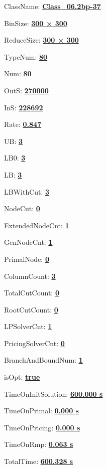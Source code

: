 \documentclass[11pt]{article}
\begin{document}
\pagestyle{empty}


ClassName: \underline{\textbf{Class_06.2bp-37}}
\par
BinSize: \underline{\textbf{300 × 300}}
\par
ReduceSize: \underline{\textbf{300 × 300}}
\par
TypeNum: \underline{\textbf{80}}
\par
Num: \underline{\textbf{80}}
\par
OutS: \underline{\textbf{270000}}
\par
InS: \underline{\textbf{228692}}
\par
Rate: \underline{\textbf{0.847}}
\par
UB: \underline{\textbf{3}}
\par
LB0: \underline{\textbf{3}}
\par
LB: \underline{\textbf{3}}
\par
LBWithCut: \underline{\textbf{3}}
\par
NodeCut: \underline{\textbf{0}}
\par
ExtendedNodeCnt: \underline{\textbf{1}}
\par
GenNodeCnt: \underline{\textbf{1}}
\par
PrimalNode: \underline{\textbf{0}}
\par
ColumnCount: \underline{\textbf{3}}
\par
TotalCutCount: \underline{\textbf{0}}
\par
RootCutCount: \underline{\textbf{0}}
\par
LPSolverCnt: \underline{\textbf{1}}
\par
PricingSolverCnt: \underline{\textbf{0}}
\par
BranchAndBoundNum: \underline{\textbf{1}}
\par
isOpt: \underline{\textbf{true}}
\par
TimeOnInitSolution: \underline{\textbf{600.000 s}}
\par
TimeOnPrimal: \underline{\textbf{0.000 s}}
\par
TimeOnPricing: \underline{\textbf{0.000 s}}
\par
TimeOnRmp: \underline{\textbf{0.063 s}}
\par
TotalTime: \underline{\textbf{600.328 s}}
\par
\newpage
\end{document}
